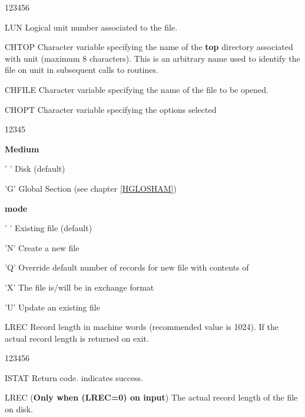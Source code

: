 \Idesc
\begin{DLtt}{123456}
\item[LUN]
    Logical unit number associated to the file.
\item[CHTOP]
    Character variable specifying the name of the {\bf top} directory
    associated with unit  (maximum 8 characters).
    This is an arbitrary name used to identify the file on unit 
    in subsequent calls to  routines.
\item[CHFILE]
    Character variable specifying the name of the file to be opened.
\item[CHOPT]
    Character variable specifying the options selected
    \begin{DLtt}{12345}
        \item[{\rm\bf Medium}]
        \begin{DLtt}{12}
            \item[' '] Disk (default)
            \item['G'] Global Section (see chapter \ref{HGLOSHAM})
        \end{DLtt}
        \item[{\rm\bf mode}]
        \begin{DLtt}{12}
            \item[' '] Existing  file (default)
            \item['N'] Create a new file
            \item['Q'] Override default number of records for new file
                with contents of 
            \item['X'] The file is/will be in exchange format
            \item['U'] Update an existing file
        \end{DLtt}
    \end{DLtt}
    \item[LREC] Record length in machine words (recommended value is 1024).
                If  the actual record length is returned on exit.
\end{DLtt}
\Odesc
\begin{DLtt}{123456}
    \item[ISTAT] Return code.  indicates success.
    \item[LREC] (\textbf{Only when \Lit(LREC=0) on input})
                The actual record length of the file on disk.
\end{DLtt}
     
